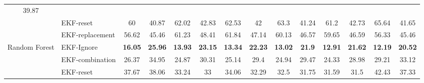 \documentclass[letterpaper, 10 pt, conference]{ieeeconf}  %
\begin{document}
\begin{table*}[]
\begin{tabular}{@{}llcccccccccccc@{}}
	\multicolumn{1}{c|}{39.87} \\ \cmidrule(l){2-14} 
	\multicolumn{1}{|l|}{} &
	\multicolumn{1}{l|}{EKF-reset} &
	\multicolumn{1}{c|}{60} &
	\multicolumn{1}{c|}{40.87} &
	\multicolumn{1}{c|}{62.02} &
	\multicolumn{1}{c|}{42.83} &
	\multicolumn{1}{c|}{62.53} &
	\multicolumn{1}{c|}{42} &
	\multicolumn{1}{c|}{63.3} &
	\multicolumn{1}{c|}{41.24} &
	\multicolumn{1}{c|}{61.2} &
	\multicolumn{1}{c|}{42.73} &
	\multicolumn{1}{c|}{65.64} &
	\multicolumn{1}{c|}{41.65} \\ \cmidrule(l){2-14} 
	\multicolumn{1}{|l|}{} &
	\multicolumn{1}{l|}{EKF-replacement} &
	\multicolumn{1}{c|}{56.62} &
	\multicolumn{1}{c|}{45.46} &
	\multicolumn{1}{c|}{61.23} &
	\multicolumn{1}{c|}{48.41} &
	\multicolumn{1}{c|}{61.84} &
	\multicolumn{1}{c|}{47.14} &
	\multicolumn{1}{c|}{60.13} &
	\multicolumn{1}{c|}{46.57} &
	\multicolumn{1}{c|}{59.65} &
	\multicolumn{1}{c|}{46.59} &
	\multicolumn{1}{c|}{56.33} &
	\multicolumn{1}{c|}{45.46} \\ \midrule
	\multicolumn{1}{|l|}{\multirow{4}{*}{Random Forest}} &
	\multicolumn{1}{l|}{EKF-Ignore} &
	\multicolumn{1}{c|}{\textbf{16.05}} &
	\multicolumn{1}{c|}{\textbf{25.96}} &
	\multicolumn{1}{c|}{\textbf{13.93}} &
	\multicolumn{1}{c|}{\textbf{23.15}} &
	\multicolumn{1}{c|}{\textbf{13.34}} &
	\multicolumn{1}{c|}{\textbf{22.23}} &
	\multicolumn{1}{c|}{\textbf{13.02}} &
	\multicolumn{1}{c|}{\textbf{21.9}} &
	\multicolumn{1}{c|}{\textbf{12.91}} &
	\multicolumn{1}{c|}{\textbf{21.62}} &
	\multicolumn{1}{c|}{\textbf{12.19}} &
	\multicolumn{1}{c|}{\textbf{20.52}} \\ \cmidrule(l){2-14} 
	\multicolumn{1}{|l|}{} &
	\multicolumn{1}{l|}{EKF-combination} &
	\multicolumn{1}{c|}{26.37} &
	\multicolumn{1}{c|}{34.95} &
	\multicolumn{1}{c|}{24.87} &
	\multicolumn{1}{c|}{30.31} &
	\multicolumn{1}{c|}{25.14} &
	\multicolumn{1}{c|}{29.4} &
	\multicolumn{1}{c|}{24.94} &
	\multicolumn{1}{c|}{29.47} &
	\multicolumn{1}{c|}{24.33} &
	\multicolumn{1}{c|}{28.98} &
	\multicolumn{1}{c|}{29.21} &
	\multicolumn{1}{c|}{33.12} \\ \cmidrule(l){2-14} 
	\multicolumn{1}{|l|}{} &
	\multicolumn{1}{l|}{EKF-reset} &
	\multicolumn{1}{c|}{37.67} &
	\multicolumn{1}{c|}{38.06} &
	\multicolumn{1}{c|}{33.24} &
	\multicolumn{1}{c|}{33} &
	\multicolumn{1}{c|}{34.06} &
	\multicolumn{1}{c|}{32.29} &
	\multicolumn{1}{c|}{32.5} &
	\multicolumn{1}{c|}{31.75} &
	\multicolumn{1}{c|}{31.59} &
	\multicolumn{1}{c|}{31.5} &
	\multicolumn{1}{c|}{42.43} &
	\multicolumn{1}{c|}{37.33} \\ \cmidrule(l){2-14} 

\end{tabular}
\end{table*}
\end{document}
